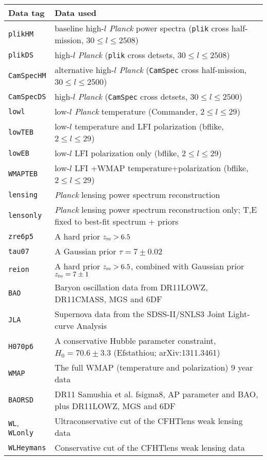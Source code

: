 \begin{tabular} { l   l  }
Data tag & Data used\\
\hline
{\tt plikHM}         & baseline high-$l$ \textit{Planck} power spectra ({\tt plik} cross half-mission, $30\le l\le 2508$) \\
{\tt plikDS}         & high-$l$ \textit{Planck} ({\tt plik} cross detsets, $30\le l\le 2508$) \\
{\tt CamSpecHM}      & alternative high-$l$ \textit{Planck}  ({\tt CamSpec} cross half-mission, $30\le l\le 2500$) \\
{\tt CamSpecDS}      & high-$l$ \textit{Planck} ({\tt CamSpec} cross detsets, $30\le l\le 2500$) \\
{\tt lowl }          & low-$l$ \textit{Planck} temperature (Commander, $2\le l \le 29$)  \\
{\tt lowTEB}         & low-$l$ temperature and LFI polarization (bflike, $2\le l \le 29$)\\
{\tt lowEB}          & low-$l$  LFI polarization only (bflike, $2\le l \le 29$)\\
{\tt WMAPTEB}       & low-$l$  LFI +WMAP temperature+polarization (bflike, $2\le l \le 29$)\\
{\tt lensing}        & \textit{Planck}  lensing power spectrum reconstruction\\
{\tt lensonly}       & \textit{Planck}  lensing power spectrum reconstruction only; T,E fixed to best-fit spectrum + priors\\
{\tt zre6p5}         & A hard prior $z_{\rm re} > 6.5$\\
{\tt tau07}          & A Gaussian prior $\tau = 7 \pm 0.02$\\
{\tt reion}          & A hard prior $z_{\rm re} > 6.5$, combined with Gaussian prior $z_{\rm re} = 7\pm 1$\\
{\tt BAO}            & Baryon oscillation data from DR11LOWZ, DR11CMASS, MGS and 6DF \\
{\tt JLA}            & Supernova data from the SDSS-II/SNLS3 Joint Light-curve Analysis \\
{\tt H070p6}         & A conservative Hubble parameter constraint, $H_0 = 70.6\pm 3.3$ (Efstathiou; arXiv:1311.3461) \\
{\tt WMAP}           & The full WMAP (temperature and polarization) 9 year data \\
{\tt BAORSD}         & DR11 Samushia et al. fsigma8, AP parameter and BAO, plus DR11LOWZ, MGS and 6DF  \\
{\tt WL}, {\tt WLonly} & Ultraconservative cut of the CFHTlens weak lensing data  \\
{\tt WLHeymans}      & Conservative cut of the CFHTlens weak lensing data  \\
\hline
\end{tabular}
